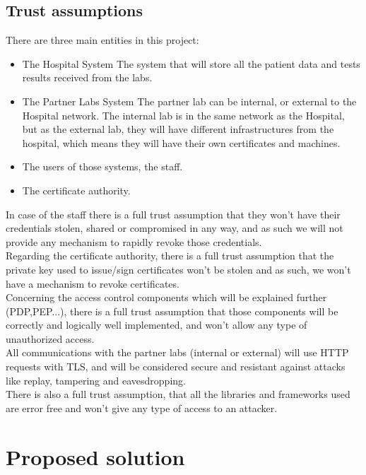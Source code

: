 \subsection{Trust assumptions}


There are three main entities in this project:\\
\begin{itemize}
	\item The Hospital System
		\subitem The system that will store all the patient data and tests results received from the labs.
	\item The Partner Labs System
		\subitem The partner lab can be internal, or external to the Hospital network. The internal lab is in the same network as the Hospital, but as the external lab, they will have different infrastructures from the hospital, which means they will have their own certificates and machines.
	\item The users of those systems, the staff.
	\item The certificate authority.
\end{itemize}

In case of the staff there is a full trust assumption that they won't have their credentials stolen, shared or compromised in any way, and as such we will not provide any mechanism to rapidly revoke those credentials. \\

Regarding the certificate authority, there is a full trust assumption that the private key used to issue/sign certificates won't be stolen and as such, we won't have a mechanism to revoke certificates. \\

Concerning the access control components which will be explained further (PDP,PEP...), there is a full trust assumption that those components will be correctly and logically well implemented, and won't allow any type of unauthorized access. \\

All communications with the partner labs (internal or external) will use HTTP requests with TLS, and will be considered secure and resistant against attacks like replay, tampering and eavesdropping. \\

There is also a full trust assumption, that all the libraries and frameworks used are error free and won't give any type of access to an attacker. \\


\section{Proposed solution}

